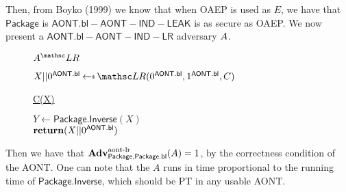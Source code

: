 \documentclass[11pt,twoside]{article}
\begin{document}
Then, from Boyko (1999) we know that when OAEP is used as $E$, we have that $\mathsf{Package}$ is $\mathsf{AONT.bl-AONT-IND-LEAK}$ is as secure as OAEP. We now present a $\mathsf{AONT.bl-AONT-IND-LR}$ adversary $A$. 

\begin{figure}[H]
{
\underline{$\advA^\LRO$}

\begin{algorithm}[H]
$X||0^\mathsf{AONT.bl} \getsr \LRO(0^\mathsf{AONT.bl},1^\mathsf{AONT.bl},C)$\\
\end{algorithm}

\underline{C(X)}

\begin{algorithm}[H]
$Y\gets\mathsf{Package.Inverse}(X)$\\
$\Return (X||0^\mathsf{AONT.bl})$\\
\end{algorithm}
}
\end{figure}

Then we have that $\textbf{Adv}^\text{aont-lr}_{\mathsf{Package},\mathsf{Package.bl}}(A)=1$, by the correctness condition of the AONT. One can note that the $A$ runs in time proportional to the running time of $\mathsf{Package.Inverse}$, which should be PT in any usable AONT. 
\end{document}
